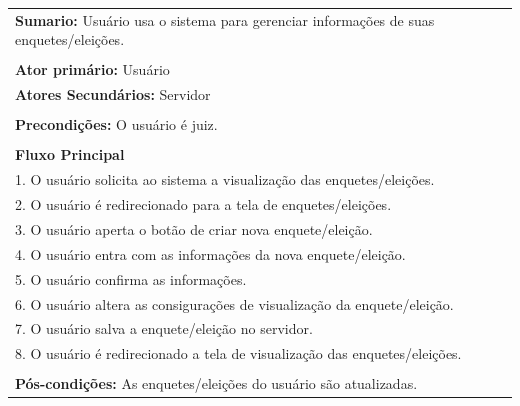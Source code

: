 \documentclass[a4paper,12pt]{article}
\begin{document}
\begin{tabular}{|l|}\hline
	{\textbf{Sumario:}} Usuário usa o sistema para gerenciar informações de suas enquetes/eleições.\ \ \ \ \ \ \ \ \ \ \\\\
	{\textbf{Ator primário:}} Usuário \\
	{\textbf{Atores Secundários:}} Servidor\\\\
	{\textbf{Precondições:}} O usuário é juiz.\\\\
	{\textbf{Fluxo Principal}}\\
	1. O usuário solicita ao sistema a visualização das enquetes/eleições.\\
	2. O usuário é redirecionado para a tela de enquetes/eleições. \\
	3. O usuário aperta o botão de criar nova enquete/eleição. \\
	4. O usuário entra com as informações da nova enquete/eleição.\\
	5. O usuário confirma as informações.\\
	6. O usuário altera as consigurações de visualização da enquete/eleição.\\
	7. O usuário salva a enquete/eleição no servidor.\\
	8. O usuário é redirecionado a tela de visualização das enquetes/eleições.\\\\
	{\textbf{Pós-condições:}} As enquetes/eleições do usuário são atualizadas.\\
	\hline
\end{tabular}
\end{document}
